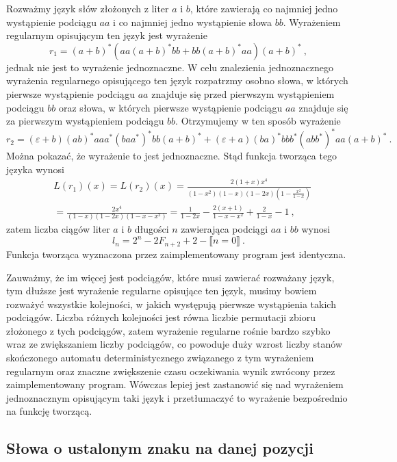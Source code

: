 Rozważmy język słów złożonych z liter $a$ i $b$, które zawierają co najmniej jedno wystąpienie podciągu $aa$ i co najmniej jedno wystąpienie słowa $bb$. Wyrażeniem regularnym opisującym ten język jest wyrażenie
$$r_1=(a+b)^*(aa(a+b)^*bb+bb(a+b)^*aa)(a+b)^*~,$$
jednak nie jest to wyrażenie jednoznaczne. W celu znalezienia jednoznacznego wyrażenia regularnego opisującego ten język rozpatrzmy osobno słowa, w których pierwsze wystąpienie podciągu $aa$ znajduje się przed pierwszym wystąpieniem podciągu $bb$ oraz słowa, w których pierwsze wystąpienie podciągu $aa$ znajduje się za pierwszym wystąpieniem podciągu $bb$. Otrzymujemy w ten sposób wyrażenie
$$r_2=(\varepsilon+b)(ab)^*aaa^*(baa^*)^*bb(a+b)^*+(\varepsilon+a)(ba)^*bbb^*(abb^*)^*aa(a+b)^*~.$$
Można pokazać, że wyrażenie to jest jednoznaczne. Stąd funkcja tworząca tego języka wynosi
\begin{equation*}
    \begin{aligned}
        &L(r_1)(x)=L(r_2)(x)=\frac{2(1+x)x^4}{(1-x^2)(1-x)(1-2x)(1-\frac{x^2}{1-x})}\\
        &=\frac{2x^4}{(1-x)(1-2x)(1-x-x^2)}=\frac{1}{1-2x}-\frac{2(x+1)}{1-x-x^2}+\frac{2}{1-x}-1~,
    \end{aligned}
\end{equation*}
zatem liczba ciągów liter $a$ i $b$ długości $n$ zawierająca podciągi $aa$ i $bb$ wynosi
$$l_n=2^n-2F_{n+2}+2-\llbracket n=0\rrbracket~.$$
Funkcja tworząca wyznaczona przez zaimplementowany program jest identyczna.

Zauważmy, że im więcej jest podciągów, które musi zawierać rozważany język, tym dłuższe jest wyrażenie regularne opisujące ten język, musimy bowiem rozważyć wszystkie kolejności, w jakich występują pierwsze wystąpienia takich podciągów. Liczba różnych kolejności jest równa liczbie permutacji zbioru złożonego z tych podciągów, zatem wyrażenie regularne rośnie bardzo szybko wraz ze zwiększaniem liczby podciągów, co powoduje duży wzrost liczby stanów skończonego automatu deterministycznego związanego z tym wyrażeniem regularnym oraz znaczne zwiększenie czasu oczekiwania wynik zwrócony przez zaimplementowany program. Wówczas lepiej jest zastanowić się nad wyrażeniem jednoznacznym opisującym taki język i przetłumaczyć to wyrażenie bezpośrednio na funkcję tworzącą.

\subsection{Słowa o ustalonym znaku na danej pozycji}

